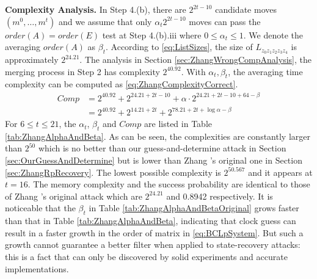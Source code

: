 \noindent\textbf{Complexity Analysis. }
In Step 4.(b), there are $2^{2t-10}$ candidate moves $(m^0,\ldots, m^{t})$ and we assume that only $\alpha_t 2^{2t-10}$ moves can pass the $order(A)=order(E)$ test at Step 4.(b).iii where $0\leq \alpha_t \leq 1$.
We denote the averaging $order(A)$ as $\beta_t$. 
According to \eqref{eq:ListSizes}, the size of $L_{z_0z_1z_2z_3z_4}$ is approximately $2^{24.21}$.
The analysis in Section \ref{sec:ZhangWrongCompAnalysis}, the merging process in Step 2 has complexity $2^{40.92}$.
With $\alpha_t ,\beta_t $, the averaging time complexity can be computed as \eqref{eq:ZhangComplexityCorrect}.
\begin{equation}\label{eq:ZhangComplexityCorrect}
\begin{aligned}
Comp&=2^{40.92}+2^{24.21+2t-10}+\alpha \cdot 2^{24.21+2t-10+64-\beta}\\
&=2^{40.92}+2^{14.21+2t}+2^{78.21+2t+\log \alpha -\beta}
\end{aligned}
\end{equation}
For $6\leq t\leq 21$, the $\alpha_t$, $\beta_t$ and $Comp$ are listed in Table \ref{tab:ZhangAlphaAndBeta}.
As can be seen, the complexities are constantly larger than $2^{50}$ which is no better than our guess-and-determine attack in Section \ref{sec:OurGuessAndDetermine} but is lower than Zhang \etal's original one in Section \ref{sec:ZhangRpRecovery}.
The lowest possible complexity is $2^{50.567}$ and it appears at $t=16$.
The memory complexity and the success probability are identical to those of Zhang \etal's original attack which are $2^{24.21}$ and 0.8942 respectively.
It is noticeable that the $\beta_t$ in Table \ref{tab:ZhangAlphaAndBetaOriginal} grows faster than that in Table \ref{tab:ZhangAlphaAndBeta}, indicating that clock guess can result in a faster growth in the order of matrix in \eqref{eq:BCLpSystem}. 
But such a growth cannot guarantee a better filter when applied to state-recovery attacks: 
this is a fact that can only be discovered by solid experiments and accurate implementations. 

